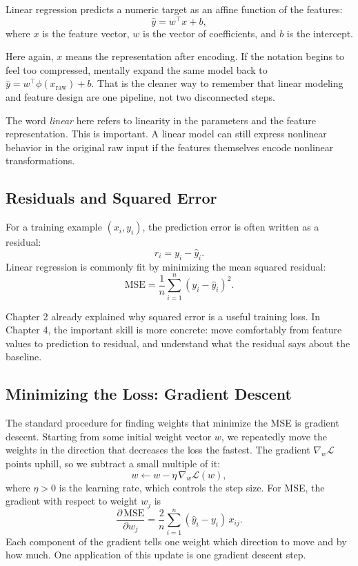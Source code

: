 \begin{definition}
Linear regression predicts a numeric target as an affine function of the features:
\[
\hat{y} = w^\top x + b,
\]
where $x$ is the feature vector, $w$ is the vector of coefficients, and $b$ is the intercept.
\end{definition}

Here again, \(x\) means the representation after encoding. If the notation begins to feel too compressed, mentally expand the same model back to \(\hat{y} = w^\top \phi(x_{\text{raw}}) + b\). That is the cleaner way to remember that linear modeling and feature design are one pipeline, not two disconnected steps.

The word \emph{linear} here refers to linearity in the parameters and the feature representation. This is important. A linear model can still express nonlinear behavior in the original raw input if the features themselves encode nonlinear transformations.

\subsection{Residuals and Squared Error}

For a training example $(x_i, y_i)$, the prediction error is often written as a residual:
\[
r_i = y_i - \hat{y}_i.
\]
Linear regression is commonly fit by minimizing the mean squared residual:
\[
\text{MSE} = \frac{1}{n} \sum_{i=1}^{n} (y_i - \hat{y}_i)^2.
\]

Chapter 2 already explained why squared error is a useful training loss. In Chapter 4, the important skill is more concrete: move comfortably from feature values to prediction to residual, and understand what the residual says about the baseline.

\subsection{Minimizing the Loss: Gradient Descent}

The standard procedure for finding weights that minimize the MSE is gradient descent. Starting from some initial weight vector $w$, we repeatedly move the weights in the direction that decreases the loss the fastest. The gradient $\nabla_w \mathcal{L}$ points uphill, so we subtract a small multiple of it:
\[
w \leftarrow w - \eta \, \nabla_w \mathcal{L}(w),
\]
where $\eta > 0$ is the learning rate, which controls the step size. For MSE, the gradient with respect to weight $w_j$ is
\[
\frac{\partial \,\text{MSE}}{\partial w_j} = \frac{2}{n} \sum_{i=1}^{n} (\hat{y}_i - y_i) \, x_{ij}.
\]
Each component of the gradient tells one weight which direction to move and by how much. One application of this update is one gradient descent step.

